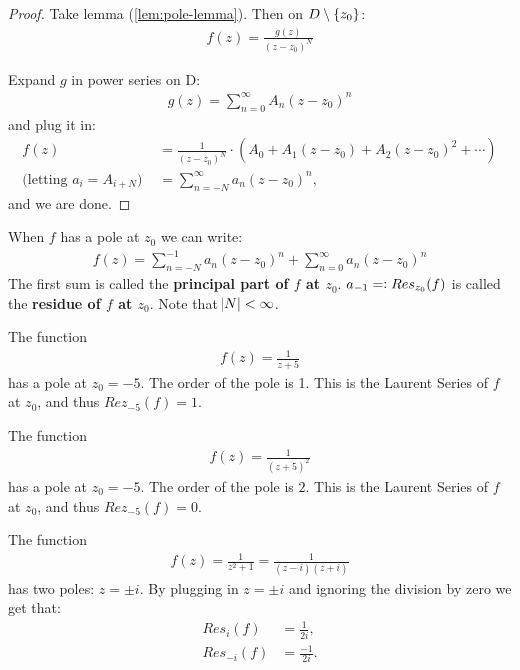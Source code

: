 \begin{proof}
Take lemma (\ref{lem:pole-lemma}). Then on $D \setminus \{ z_0 \}$:
\begin{align*}
    f(z) = \frac{g(z)}{(z-z_0)^N} 
\end{align*}

Expand $g$ in power series on D:
\begin{align*}
g(z) = \sum_{n=0}^\infty A_n (z-z_0)^n
\end{align*}
and plug it in:
\begin{align*}
    f(z) &= \frac{1}{(z-z_0)^N} \cdot (A_0 + A_1(z-z_0) + A_2 (z-z_0)^2 + \cdots)\\
    \text{(letting $a_i = A_{i+N}$) } &= \sum_{n=-N}^\infty a_n (z-z_0)^n,
\end{align*}
and we are done.
\end{proof}

\begin{definition}

When $f$ has a pole at $z_0$ we can write:
\begin{align*}
    f(z) = \sum_{n=-N}^{-1} a_n (z-z_0)^n + \sum_{n=0}^{\infty} a_n (z-z_0)^n
\end{align*}
The first sum is called the \textbf{principal part of $f$ at $z_0$}. $a_{-1} = \vcentcolon Res_{z_0} (f)$ is called the \textbf{residue of $f$ at $z_0$}. Note that $\abs{N} < \infty$.
\end{definition}

\begin{example}
The function
\begin{align*}
f(z) = \frac{1}{z+5}
\end{align*}
has a pole at $z_0 = -5$. The order of the pole is 1. This is the Laurent Series of $f$ at $z_0$, and thus $Rez_{-5}(f) = 1 $.
\end{example}



\begin{example}
The function
\begin{align*}
f(z) = \frac{1}{(z+5)^2}
\end{align*}
has a pole at $z_0 = -5$. The order of the pole is $2$. This is the Laurent Series of $f$ at $z_0$, and thus $Rez_{-5}(f) = 0 $.
\end{example}



\begin{example}
The function
\begin{align*}
f(z) = \frac{1}{z^2+1} = \frac{1}{(z-i)(z+i)}
\end{align*}
has two poles: $z = \pm i$. By plugging in $z= \pm i$ and ignoring the division by zero we get that:
\begin{align*}
    Res_i(f) &= \frac{1}{2i},\\
    Res_{-i}(f) &= \frac{-1}{2i}.
\end{align*}

\end{example}










